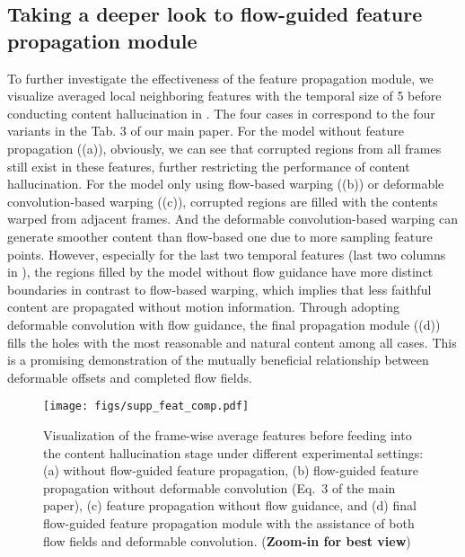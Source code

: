 \documentclass[final]{cvpr}
\begin{document}
\subsection{Taking a deeper look to flow-guided feature propagation module}
To further investigate the effectiveness of the feature propagation module, we visualize averaged local neighboring features with the temporal size of 5 before conducting content hallucination in .
The four cases in  correspond to the four variants in the Tab. 3 of our main paper.
For the model without feature propagation ((a)), obviously, we can see that corrupted regions from all frames still exist in these features, further restricting the performance of content hallucination.
For the model only using flow-based warping ((b)) or deformable convolution-based warping ((c)), corrupted regions are filled with the contents warped from adjacent frames.
And the deformable convolution-based warping can generate smoother content than flow-based one due to more sampling feature points.
However, especially for the last two temporal features (last two columns in ), the regions filled by the model without flow guidance have more distinct boundaries in contrast to flow-based warping, which implies that less faithful content are propagated without motion information.
Through adopting deformable convolution with flow guidance, the final propagation module ((d)) fills the holes with the most reasonable and natural content among all cases.
This is a promising demonstration of the mutually beneficial relationship between deformable offsets and completed flow fields.

\begin{figure*}[t]
    \centering
    \texttt{[image: figs/supp\_feat\_comp.pdf]}
    \caption{Visualization of the frame-wise average features before feeding into the content hallucination stage under different experimental settings:
    (a) without flow-guided feature propagation, 
    (b) flow-guided feature propagation without deformable convolution (Eq.~3 of the main paper),
    (c) feature propagation without flow guidance,
    and (d) final flow-guided feature propagation module with the assistance of both flow fields and deformable convolution.
    (\textbf{Zoom-in for best view})}
    \label{fig:supp-feat-comp}
\end{figure*}
\end{document}
